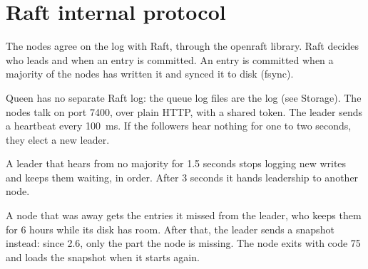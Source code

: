 
\section{Raft internal protocol}

The nodes agree on the log with Raft, through the openraft library. Raft decides who leads and when
an entry is committed. An entry is committed when a majority of the nodes has written it and
synced it to disk (fsync).

Queen has no separate Raft log: the queue log files are the log (see Storage). The nodes talk on
port 7400, over plain HTTP, with a shared token. The leader sends a heartbeat every 100~ms. If the
followers hear nothing for one to two seconds, they elect a new leader.

A leader that hears from no majority for 1.5 seconds stops logging new writes and keeps them
waiting, in order. After 3 seconds it hands leadership to another node.


A node that was away gets the entries it missed from the leader, who keeps them for 6 hours while
its disk has room. After that, the leader sends a snapshot instead: since 2.6, only the part the
node is missing. The node exits with code 75 and loads the snapshot when it starts again.
